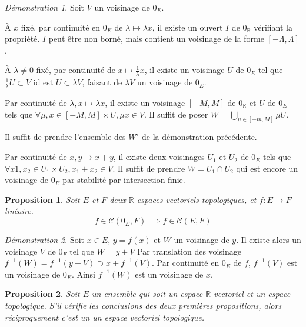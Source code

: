 \documentclass[a4paper, 11pt, french]{book}
\newenvironment{itemise}{\itemize}{\enditemize}
\theoremstyle{plain} %
\newtheorem{proposition}{Proposition}
\theoremstyle{definition} %
\theoremstyle{remark} %
\newtheorem*{demonstration}{Démonstration}
\newcommand{\1}{\mathds{1}}
\newcommand{\inv}[1]{#1^{-1}}
\newcommand{\R}{\mathbb{R}}
\renewcommand{\cal}[1]{\mathcal{#1}}
\begin{document}
\begin{demonstration}
	Soit $V$ un voisinage de $0_E$.
	\begin{itemise}
		\item À $x$ fixé, par continuité en $0_E$ de $\lambda\longmapsto\lambda x$, il existe un ouvert $I$ de $0_\R$ vérifiant la propriété.
		$I$ peut être non borné, mais contient un voisinage de la forme $[-\Lambda, \Lambda]$.
		\item À $\lambda\neq0$ fixé, par continuité de $x\longmapsto\frac{1}{\lambda}x$, il existe un voisinage $U$ de $0_E$ tel que $\frac{1}{\lambda}U\subset V$ id est $U\subset\lambda V$, faisant de $\lambda V$ un voisinage de $0_E$.
		\item Par continuité de $\lambda, x\longmapsto\lambda x$, il existe un voisinage $[-M, M]$ de $0_\R$ et $U$ de $0_E$ tels que $\forall\mu, x\in[-M, M]\times U, \mu x\in V$.
		Il suffit de poser $W=\bigcup_{\mu\in[-m, M]}\mu U$.
		\item Il suffit de prendre l'ensemble des $W^\circ$ de la démonstration précédente.
		\item Par continuité de $x, y\longmapsto x+y$, il existe deux voisinages $U_1$ et $U_2$ de $0_E$ tels que $\forall x1, x_2\in U_1\times U_2, x_1+x_2\in V$.
		Il suffit de prendre $W=U_1\cap U_2$ qui est encore un voisinage de $0_E$ par stabilité par intersection finie.
	\end{itemise}
\end{demonstration}

\begin{proposition}
	Soit $E$ et $F$ deux $\R$-espaces vectoriels topologiques, et $f:E\rightarrow F$ linéaire.
	$$
		f\in\cal{C}(0_E, F)\implies f\in\cal{C}(E, F)
	$$
\end{proposition}

\begin{demonstration}
	Soit $x\in E$, $y=f(x)$ et $W$ un voisinage de $y$.
	Il existe alors un voisinage $V$ de $0_F$ tel que $W=y+V$
	Par translation des voisinage $\inv{f}(W)=\inv{f}(y+V)\supset x+\inv{f}(V)$.
	Par continuité en $0_E$ de $f$, $\inv{f}(V)$ est un voisinage de $0_E$.
	Ainsi $\inv{f}(W)$ est un voisinage de $x$.
\end{demonstration}

\begin{proposition}
	Soit $E$ un ensemble qui soit un espace $\R$-vectoriel et un espace topologique.
	S'il vérifie les conclusions des deux premières propositions, alors réciproquement c'est un un espace vectoriel topologique.
\end{proposition}
\end{document}
